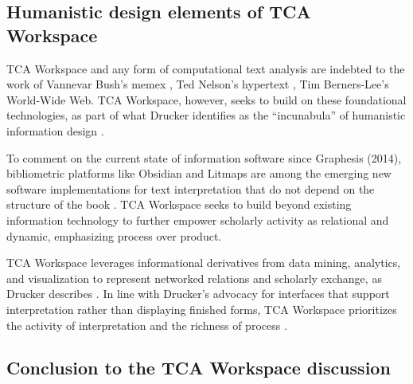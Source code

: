 \subsection{Humanistic design elements of TCA Workspace}

TCA Workspace and any form of computational text analysis are indebted to the work of Vannevar Bush’s memex \citep{bush_as_1945}, Ted Nelson’s hypertext \citep{nelson_literary_1981}, Tim Berners-Lee’s World-Wide Web. TCA Workspace, however, seeks to build on these foundational technologies, as part of what Drucker identifies as the “incunabula” of humanistic information design \citep[p. 176]{drucker_graphesis_2014}.

To comment on the current state of information software since Graphesis (2014), bibliometric platforms like Obsidian and Litmaps are among the emerging new software implementations for text interpretation that do not depend on the structure of the book \citep[p. 176]{drucker_graphesis_2014}. TCA Workspace seeks to build beyond existing information technology to further empower scholarly activity as relational and dynamic, emphasizing process over product.

TCA Workspace leverages informational derivatives from data mining, analytics, and visualization to represent networked relations and scholarly exchange, as Drucker describes \citep[p. 176]{drucker_graphesis_2014}. In line with Drucker's advocacy for interfaces that support interpretation rather than displaying finished forms, TCA Workspace prioritizes the activity of interpretation and the richness of process \citep[p. 178-179]{drucker_graphesis_2014}. 

\subsection{Conclusion to the TCA Workspace discussion}

